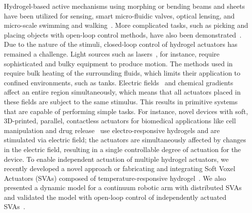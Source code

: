 Hydrogel-based active mechanisms using morphing or bending beams and sheets have been utilized for sensing, smart micro-fluidic valves, optical lensing, and micro-scale swimming and walking~\cite{Ionov2014}. More complicated tasks, such as picking and placing objects with open-loop control methods, have also been demonstrated~\cite{Wang2015b}. Due to the nature of the stimuli, closed-loop control of hydrogel actuators has remained a challenge. Light sources such as lasers~\cite{Luo2015}, for instance, require sophisticated and bulky equipment to produce motion. The methods used in~\cite{Kim2015a} require bulk heating of the surrounding fluids, which limits their application to confined environments, such as tanks. Electric fields~\cite{Morales2014} and  chemical gradients~\cite{Du2019, Nguyen2017} affect an entire region simultaneously, which means that all actuators placed in these fields are subject to the same stimulus. This results in primitive systems that are capable of performing  simple tasks. For instance, novel devices with soft, 3D-printed, parallel, contactless actuators for biomedical applications like cell manipulation and drug release~\cite{Zolfagharian2018} use electro-responsive hydrogels and are stimulated via electric field; the actuators are simultaneously affected by changes in the electric field, resulting in a single controllable degree of actuation for the device. To enable independent actuation of multiple hydrogel actuators, we recently developed a novel approach or fabricating and integrating Soft Voxel Actuators (SVAs) composed of temperature-responsive hydrogel~\cite{Khodambashi2021}. We also presented a dynamic model for a continuum robotic arm with distributed SVAs and validated the model with open-loop control of independently actuated SVAs~\cite{Doroudchi2020}.  

